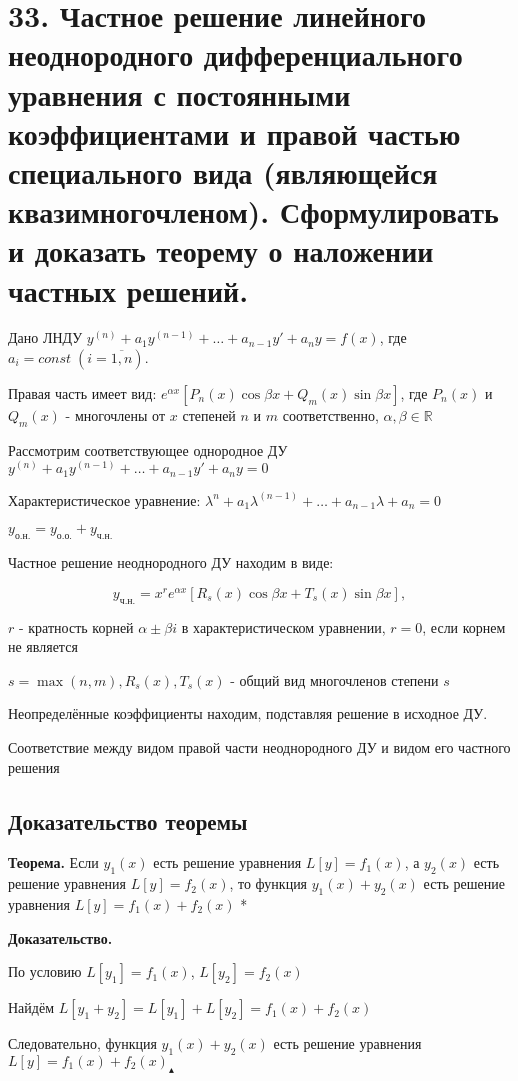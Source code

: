 \documentclass[11pt]{article}
\begin{document}
\section*{33. Частное решение линейного неоднородного дифференциального уравнения с постоянными коэффициентами и правой частью специального вида (являющейся квазимногочленом). Сформулировать и доказать теорему о наложении частных решений.}
\par Дано ЛНДУ $y^{(n)} + a_{1}y^{(n-1)} + \dots + a_{n-1}y' + a_{n}y = f(x)$, где $a_{i} = const \; (i = \overline{1, n})$.
\par Правая часть имеет вид: $e^{\alpha x} [P_{n}(x)\cos\beta x + Q_{m}(x)\sin\beta x]$, где $P_{n}(x)$ и $Q_{m}(x)$ - многочлены от $x$ степеней $n$ и $m$ соответственно, $\alpha, \beta \in \mathbb{R}$
\par Рассмотрим соответствующее однородное ДУ $y^{(n)} + a_{1}y^{(n-1)} + \dots + a_{n-1}y' + a_{n}y = 0$
\par Характеристическое уравнение: $\lambda^{n} + a_{1}\lambda^{(n-1)} + \dots + a_{n-1}\lambda + a_{n} = 0$
\par $y_{\text{о.н.}} = y_{\text{о.о.}} +y_{\text{ч.н.}}$
\par Частное решение неоднородного ДУ находим в виде:
\par $$y_{\text{ч.н.}} = x^{r}e^{\alpha x}[R_{s}(x)\cos\beta x + T_{s}(x)\sin\beta x],$$
\par $r$ - кратность корней $\alpha \pm \beta i$ в характеристическом уравнении, $r = 0$, если корнем не является
\par $s = \max(n, m), R_{s}(x), T_{s}(x)$ - общий вид многочленов степени $s$
\par Неопределённые коэффициенты находим, подставляя решение в исходное ДУ.
\par Соответствие между видом правой части неоднородного ДУ и видом его частного решения

\subsection*{Доказательство теоремы}
\par\textbf{Теорема.} Если $y_{1}(x)$ есть решение уравнения $L[y] = f_{1}(x)$, а $y_{2}(x)$ есть решение уравнения $L[y] = f_{2}(x)$, то функция $y_{1}(x) + y_{2}(x)$ есть решение уравнения $L[y] = f_{1}(x) + f_{2}(x)$
*\par\textbf{Доказательство.}
\par По условию $L[y_1] = f_{1}(x)$, $L[y_2] = f_{2}(x)$
\par Найдём $L[y_{1} + y_{2}] = L[y_{1}] + L[y_{2}] = f_{1}(x) + f_{2}(x)$
\par Следовательно, функция $y_{1}(x) + y_{2}(x)$ есть решение уравнения $L[y] = f_{1}(x) + f_{2}(x) _{\blacktriangle}$
\end{document}
